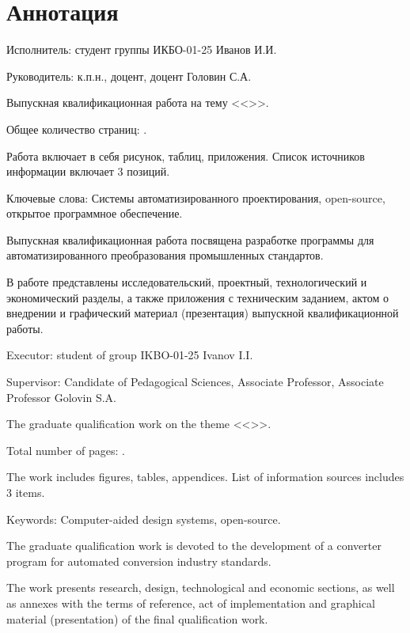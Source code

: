 \chapter*{Аннотация}
\thispagestyle{empty}  %

Исполнитель: студент группы ИКБО-01-25 Иванов И.И.\par
Руководитель: к.п.н., доцент, доцент Головин С.А.\par
Выпускная квалификационная работа на тему <<>>.\par
Общее количество страниц: \pageref{lastpage}.\par
Работа включает в себя \totalfigures рисунок, \totaltables таблиц,
  приложения.
Список источников информации включает 3 позиций.

Ключевые слова:
Системы автоматизированного проектирования,
open-source, открытое программное обеспечение.

Выпускная квалификационная работа посвящена разработке
программы для автоматизированного преобразования промышленных стандартов.

В работе представлены исследовательский, проектный, технологический
и экономический разделы,
а также приложения с техническим заданием,
актом о внедрении
и графический материал (презентация) выпускной квалификационной работы. %

Executor: student of group IKBO-01-25 Ivanov I.I.\par
Supervisor: Candidate of Pedagogical Sciences, Associate Professor, Associate Professor Golovin S.A.\par
The graduate qualification work on the theme <<>>.\par
Total number of pages: \pageref{lastpage}.\par
The work includes \totalfigures figures, \totaltables tables,
 appendices.
List of information sources includes 3 items.

Keywords:
Computer-aided design systems, open-source.

The graduate qualification work is devoted to the development
of a converter program for automated conversion industry standards.

The work presents research, design, technological and economic sections,
as well as annexes with the terms of reference, act of implementation
and graphical material (presentation) of the final qualification work.
\thispagestyle{empty}  %

